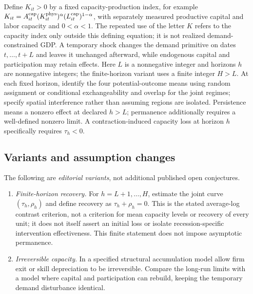 \documentclass[11pt,a4paper]{article}
\begin{document}
Define \(K_{it}>0\) by a fixed capacity-production index, for example \(K_{it}=A_{it}^{\rm cap}(K_{it}^{\rm phys})^\alpha(L_{it}^{\rm cap})^{1-\alpha}\), with separately measured productive capital and labor capacity and \(0<\alpha<1\). The repeated use of the letter \(K\) refers to the capacity index only outside this defining equation; it is not realized demand-constrained GDP. A temporary shock changes the demand primitive on dates \(t,\ldots,t+L\) and leaves it unchanged afterward, while endogenous capital and participation may retain effects. Here \(L\) is a nonnegative integer and horizons \(h\) are nonnegative integers; the finite-horizon variant uses a finite integer \(H>L\). At each fixed horizon, identify the four potential-outcome means using random assignment or conditional exchangeability and overlap for the joint regimes; specify spatial interference rather than assuming regions are isolated. Persistence means a nonzero effect at declared \(h>L\); permanence additionally requires a well-defined nonzero limit. A contraction-induced capacity loss at horizon \(h\) specifically requires \(\tau_h<0\).
\subsection*{Variants and assumption changes}
The following are \emph{editorial variants}, not additional published open conjectures.
\begin{enumerate}
\item \emph{Finite-horizon recovery.} For \(h=L+1,\ldots,H\), estimate the joint curve \((\tau_h,\rho_h)\) and define recovery as \(\tau_h+\rho_h=0\). This is the stated average-log contrast criterion, not a criterion for mean capacity levels or recovery of every unit; it does not itself assert an initial loss or isolate recession-specific intervention effectiveness. This finite statement does not impose asymptotic permanence.
\item \emph{Irreversible capacity.} In a specified structural accumulation model allow firm exit or skill depreciation to be irreversible. Compare the long-run limits with a model where capital and participation can rebuild, keeping the temporary demand disturbance identical.
\end{enumerate}
\end{document}
